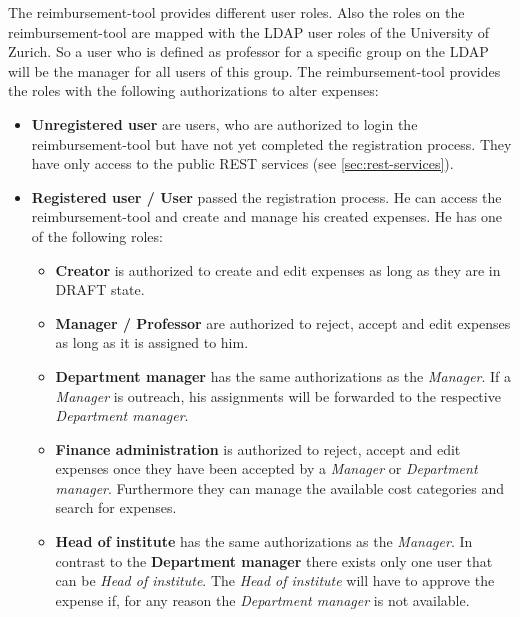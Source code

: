 The reimbursement-tool provides different user roles. Also the roles on the reimbursement-tool are mapped with the LDAP user roles of the University of Zurich. So a user who is defined as professor for a specific group on the LDAP will be the manager for all users of this group. The reimbursement-tool provides the roles with the following authorizations to alter expenses:

\begin{itemize}
    \item \textbf{Unregistered user} are users, who are authorized to login the reimbursement-tool but have not yet completed the registration process. They have only access to the public REST services (see \ref{sec:rest-services}).
    \item \textbf{Registered user / User} passed the registration process. He can access the reimbursement-tool and create and manage his created expenses. He has one of the following roles:

    \begin{itemize}
        \item \textbf{Creator} is authorized to create and edit expenses as long as they are in DRAFT state.

        \item \textbf{Manager / Professor} are authorized to reject, accept and edit expenses as long as it is assigned to him.

        \item \textbf{Department manager} has the same authorizations as the \textit{Manager}. If a \textit{Manager} is outreach, his assignments will be forwarded to the respective \textit{Department manager}.

        \item \textbf{Finance administration} is authorized to reject, accept and edit expenses once they have been accepted by a \textit{Manager} or \textit{Department manager}. Furthermore they can manage the available cost categories and search for expenses.

        \item \textbf{Head of institute} has the same authorizations as the \textit{Manager}. In contrast to the \textbf{Department manager} there exists only one user that can be \textit{Head of institute}. The \textit{Head of institute} will have to approve the expense if, for any reason the \textit{Department manager} is not available.
    \end{itemize}
\end{itemize}


